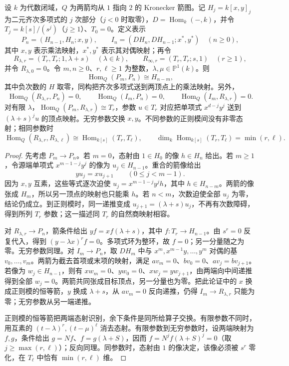 \begin{lemma}\label{b5:lem:kronecker-factorization-data}
	设 \(k\) 为代数闭域，\(Q\) 为两箭均从 \(1\) 指向 \(2\) 的 Kronecker 箭图。记 \(H_j=k[x,y]_j\) 为二元齐次多项式的 \(j\) 次部分（\(j<0\) 时取零），\(D=\operatorname{Hom}_k(-,k)\)，并令 \(T_j=k[s]/(s^j)\)（\(j\ge1\)）、\(T_0=0\)。定义表示
	\[
		P_n=(H_{n-1},H_n;x,y),\qquad
		I_n=(DH_n,DH_{n-1};x^*,y^*)\quad(n\ge0),
	\]
	其中 \(x,y\) 表示乘法映射，\(x^*,y^*\) 表示其对偶映射；再令
	\[
		R_{\lambda,r}=(T_r,T_r;1,\lambda+s)\quad(\lambda\in k),\qquad
		R_{\infty,r}=(T_r,T_r;s,1)\quad(r\ge1),
	\]
	并令 \(R_{\lambda,0}=0\)。令 \(m,n\ge0\)、\(r,\ell\ge1\) 为整数，\(\lambda,\mu\in\mathbb P^1(k)\)。则
	\[
		\operatorname{Hom}_Q(P_m,P_n)\cong H_{n-m},
	\]
	其中负次数的 \(H\) 取零，同构把齐次多项式送到两顶点上的乘法映射。另外，
	\[
		\operatorname{Hom}_Q(R_{\lambda,r},P_n)=0,
		\qquad\operatorname{Hom}_Q(I_m,P_n)=0,
		\qquad\operatorname{Hom}_Q(I_m,R_{\lambda,r})=0.
	\]
	对有限 \(\lambda\)，\(\operatorname{Hom}_Q(P_m,R_{\lambda,r})\cong T_r\)，参数 \(u\in T_r\) 对应把单项式 \(x^{d-j}y^j\) 送到 \((\lambda+s)^j u\) 的顶点映射。无穷参数交换 \(x,y\)。不同参数的正则模间没有非零态射；相同参数时
	\[
		\operatorname{Hom}_Q(R_{\lambda,r},R_{\lambda,\ell})
		\cong\operatorname{Hom}_{k[s]}(T_r,T_\ell),
		\qquad \dim_k\operatorname{Hom}_{k[s]}(T_r,T_\ell)=\min(r,\ell).
	\]
\end{lemma}
\begin{proof}
	先考虑 \(P_m\to P_n\)。若 \(m=0\)，态射由 \(1\in H_0\) 的像 \(h\in H_n\) 给出。若 \(m\ge1\)，令源端单项式 \(x^{m-1-j}y^j\) 的像为 \(u_j\in H_{n-1}\)。重合的箭像给出
	\[
		yu_j=xu_{j+1}\qquad(0\le j<m-1).
	\]
	因为 \(x,y\) 互素，这些等式逐次迫使 \(u_j=x^{m-1-j}y^jh\)，其中 \(h\in H_{n-m}\)。两箭的像张成 \(H_m\)，所以另一顶点的映射也只能乘 \(h\)。若 \(n<m\)，次数迫使全部 \(u_j\) 为零，结论仍成立。到正则模时，同一递推变成 \(u_{j+1}=(\lambda+s)u_j\)，不再有次数障碍，得到所列 \(T_r\) 参数；这一描述同 \(T_r\) 的自然商映射相容。

	对 \(R_{\lambda,r}\to P_n\)，箭条件给出 \(yf=x f(\lambda+s)\)，其中 \(f:T_r\to H_{n-1}\)。由 \(s^r=0\) 反复代入，得到 \((y-\lambda x)^r f=0\)。多项式环为整环，故 \(f=0\)；另一分量随之为零。无穷参数同理。对 \(I_m\to P_n\)，取 \(DH_m\) 中与 \(x^m,x^{m-1}y,\ldots,y^m\) 对偶的基 \(v_0,\ldots,v_m\)。两箭为截去首项或末项的映射，满足 \(av_m=0\)、\(bv_0=0\)、\(av_j=bv_{j+1}\)。若像为 \(w_j\in H_{n-1}\)，则有 \(xw_m=0\)、\(yw_0=0\)、\(xw_j=yw_{j+1}\)，由两端向中间递推得到全部 \(w_j=0\)。两箭共同张成目标顶点，另一分量也为零。把此论证中的 \(x\) 换成正则模的恒等箭，\(y\) 换成 \(\lambda+s\)，从 \(av_m=0\) 反向递推，仍得 \(I_m\to R_{\lambda,r}\) 只能为零；无穷参数从另一端递推。

	正则模的恒等箭把两端态射识别，余下条件是同所给算子交换。有限参数不同时，用互素的 \((t-\lambda)^r,(t-\mu)^\ell\) 消去态射。有限参数到无穷参数时，设两端映射为 \(f,g\)，条件给出 \(g=Nf\)、\(f=g(\lambda+S)\)，因而 \(f=N^j f(\lambda+S)^j=0\)（取 \(j\ge\max(r,\ell)\)）；反向同理。同参数时，态射由 \(1\) 的像决定，该像必须被 \(s^r\) 零化，在 \(T_\ell\) 中恰有 \(\min(r,\ell)\) 维。
\end{proof}

